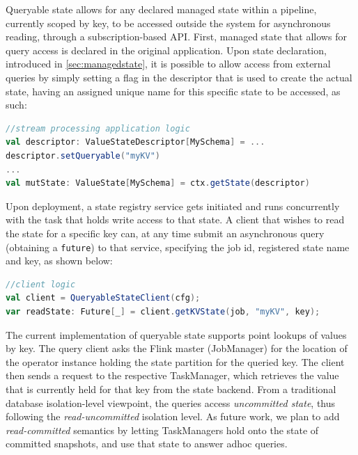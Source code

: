 Queryable state allows for any declared managed state within a pipeline, currently scoped by key, to be accessed outside the system for asynchronous reading, through a subscription-based API. First, managed state that allows for query access is declared in the original application. Upon state declaration, introduced in \autoref{sec:managedstate}, it is possible to allow access from external queries by simply setting a flag in the descriptor that is used to create the actual state, having an assigned unique name for this specific state to be accessed, as such:

\begin{lstlisting}[language=scala]
//stream processing application logic
val descriptor: ValueStateDescriptor[MySchema] = ...
descriptor.setQueryable("myKV")
...
val mutState: ValueState[MySchema] = ctx.getState(descriptor)
\end{lstlisting}

\para{} Upon deployment, a state registry service gets initiated and runs concurrently with the task that holds write access to that state. A client that wishes to read the state for a specific key can, at any time submit an asynchronous query (obtaining a \texttt{future}) to that service, specifying the job id, registered state name and key, as shown below:

\begin{lstlisting}[language=scala]
//client logic
val client = QueryableStateClient(cfg);
var readState: Future[_] = client.getKVState(job, "myKV", key);
\end{lstlisting}

The current implementation of queryable state supports point lookups of values by key. The query client asks the Flink master (JobManager) for the location of the operator instance holding the state partition for the queried key. The client then sends a request to the respective TaskManager, which retrieves the value that is currently held for that key from the state backend. From a traditional database isolation-level viewpoint, the queries access \emph{uncommitted state}, thus following the \emph{read-uncommitted} isolation level. As future work, we plan to add \emph{read-committed} semantics by letting TaskManagers hold onto the state of committed snapshots, and use that state to answer  adhoc queries.


